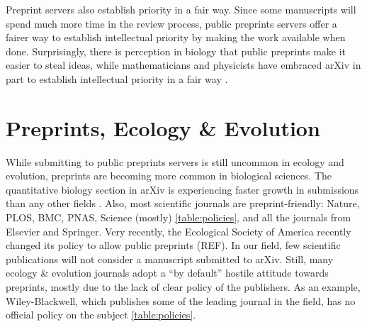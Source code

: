 \documentclass[letterpaper,twocolumn,superscriptaddress,showkeys]{revtex4}
\begin{document}
Preprint servers also establish priority in a fair way. Since some manuscripts
will spend much more time in the review process, public preprints servers offer
a fairer way to establish intellectual priority by making the work available
when done. Surprisingly, there is perception in biology that public preprints
make it easier to steal ideas, while mathematicians and physicists have embraced
arXiv in part to establish intellectual priority in a fair way \cite{cal12}.

\section{Preprints, Ecology \& Evolution}

While submitting to public preprints servers is still uncommon in ecology and
evolution, preprints are becoming more common in biological sciences. The
quantitative biology section in arXiv is experiencing faster growth in
submissions than any other fields \cite{cal12}. Also, most scientific journals
are preprint-friendly: Nature, PLOS, BMC, PNAS, Science (mostly)
\ref{table:policies}, and all the journals from Elsevier and Springer. Very
recently, the Ecological Society of America recently changed its policy to allow
public preprints (REF). In our field, few scientific publications will not
consider a manuscript submitted to arXiv.  Still, many ecology \& evolution
journals adopt a ``by default'' hostile attitude towards preprints, mostly due
to the lack of clear policy of the publishers. As an example, Wiley-Blackwell,
which publishes some of the leading journal in the field, has no official policy
on the subject \ref{table:policies}.
\end{document}
